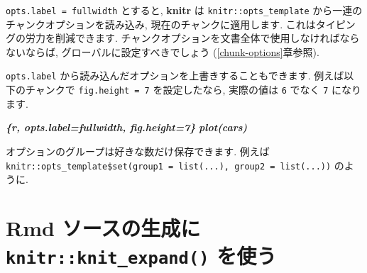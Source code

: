 \documentclass[
  11pt,
  lualatex,ja=standard,jafont=noto]{bxjsreport}
\newenvironment{Shaded}{\begin{snugshade}}{\end{snugshade}}
\newcommand{\InformationTok}[1]{\textcolor[rgb]{0.56,0.35,0.01}{\textbf{\textit{#1}}}}
\begin{document}
\begin{Shaded}
\end{Shaded}

\texttt{opts.label = \textquotesingle{}fullwidth\textquotesingle{}} とすると, \textbf{knitr} は \texttt{knitr::opts\_template} から一連のチャンクオプションを読み込み, 現在のチャンクに適用します. これはタイピングの労力を削減できます. チャンクオプションを文書全体で使用しなければならないならば, グローバルに設定すべきでしょう (\ref{chunk-options}章参照).

\texttt{opts.label} から読み込んだオプションを上書きすることもできます. 例えば以下のチャンクで \texttt{fig.height = 7} を設定したなら, 実際の値は \texttt{6} でなく \texttt{7} になります.

\begin{Shaded}
\begin{Highlighting}[]
\InformationTok{\textasciigrave{}\textasciigrave{}\textasciigrave{}\{r, opts.label=\textquotesingle{}fullwidth\textquotesingle{}, fig.height=7\}}
\InformationTok{plot(cars)}
\InformationTok{\textasciigrave{}\textasciigrave{}\textasciigrave{}}
\end{Highlighting}
\end{Shaded}

オプションのグループは好きな数だけ保存できます. 例えば \texttt{knitr::opts\_template\$set(group1 = list(...), group2 = list(...))} のように.

\hypertarget{knit-expand}{%
\section{\texorpdfstring{Rmd ソースの生成に \texttt{knitr::knit\_expand()} を使う}{Rmd ソースの生成に knitr::knit\_expand() を使う}}\label{knit-expand}}
\end{document}
